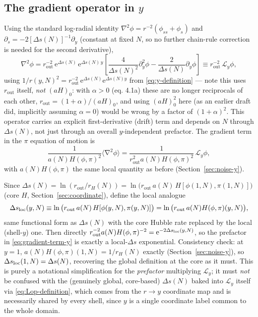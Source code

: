 \documentclass[a4paper,11pt]{article}
\newcommand{\semibold}[1]{{\fontseries{b}\selectfont{#1}}}
\newcommand{\e}[1]{\mathrm{e}^{{#1}}}
\DeclareMathOperator{\grad}{\nabla}
\newenvironment{panel}{\begin{tcolorbox}[enhanced,breakable,colback=gray!10,colframe=gray!30]\small}{\end{tcolorbox}}
\newcommand{\Ny}{N}                          %
\newcommand{\Hub}{H}                         %
\newcommand{\sfactor}{a}                     %
\newcommand{\atloc}{(\field,\mom)}           %
\newcommand{\field}{\phi}                    %
\newcommand{\mom}{\pi}                       %
\newcommand{\rad}{r}                         %
\newcommand{\yco}{y}                         %
\newcommand{\rout}{\rad_{\mathrm{out}}}      %
\newcommand{\aHo}{(\sfactor \Hub)_0}         %
\newcommand{\aHloc}{\sfactor(\Ny)\Hub\atloc} %
\newcommand{\rH}{\rad_H}                     %
\newcommand{\Deltas}{\Delta s}                %
\newcommand{\Lop}{\mathcal{L}_\yco}          %
\begin{document}
\subsection{The gradient operator in $\yco$}
\label{sec:gradient-operator}

Using the standard log-radial identity $\nabla^2\field = \rad^{-2}(\field_{ss}+\field_s)$
and $\partial_s = -2 [ \Deltas(\Ny) ]^{-1} \partial_\yco$ (constant at fixed
$\Ny$, so no further chain-rule correction is needed for the second
derivative),
\begin{equation}
    \nabla^2\field
    =
    \rout^{-2}\,\e{\Deltas(\Ny)}\,\e{\Deltas(\Ny)\,\yco}
    \left[\frac{4}{\Deltas(\Ny)^2}\partial_\yco^2\field - \frac{2}{\Deltas(\Ny)}\partial_\yco\field\right]
    \equiv
    \rout^{-2}\,\Lop\field ,
    \label{eq:Lop-definition}
\end{equation}
using $1/\rad(\yco,\Ny)^2 = \rout^{-2}\,\e{\Deltas(\Ny)}\e{\Deltas(\Ny)\yco}$
from \eqref{eq:y-definition} --- note this uses $\rout$ itself, \emph{not}
$\aHo$: with $\alpha>0$ (eq. 4.1a) these are no longer reciprocals of each
other, $\rout=(1+\alpha)/\aHo$, and using $\aHo^2$ here (as an earlier
draft did, implicitly assuming $\alpha=0$) would be wrong by a factor of
$(1+\alpha)^2$. This operator
carries an explicit first-derivative (drift) term and depends on $\Ny$
through $\Deltas(\Ny)$, not just through an overall $\yco$-independent
prefactor. The gradient term in the $\mom$ equation of motion is
\begin{equation}
    \frac{1}{\aHloc^2}\big\langle\grad^2\field\big\rangle
    =
    \frac{1}{\rout^2\aHloc^2}\,\Lop\field ,
    \label{eq:gradient-term-y}
\end{equation}
with $\aHloc$ the same local quantity as before (Section~\ref{sec:noise-y}).

\begin{panel}
\semibold{The prefactor as a ``local $\Deltas$''.} Since
$\Deltas(\Ny)=\ln(\rout/\rH(\Ny))=\ln\big(\rout\,a(\Ny)\,\Hub[\field(1,\Ny),\mom(1,\Ny)]\big)$
(core $\Hub$, Section~\ref{sec:coordinate}), define the local analogue
\begin{equation}
    \Deltas_{\rm loc}(\yco,\Ny)
    \equiv
    \ln\big(\rout\,a(\Ny)\,\Hub[\field(\yco,\Ny),\mom(\yco,\Ny)]\big)
    =
    \ln\big(\rout\,\aHloc(\yco,\Ny)\big) ,
\end{equation}
same functional form as $\Deltas(\Ny)$ with the core Hubble rate replaced
by the local (shell-$\yco$) one. Then directly
$\rout^{-2}\aHloc^{-2}=\e{-2\Deltas_{\rm loc}(\yco,\Ny)}$, so the prefactor
in \eqref{eq:gradient-term-y} is exactly a local-$\Deltas$ exponential.
Consistency check: at $\yco=1$, $\aHloc(1,\Ny)=1/\rH(\Ny)$ exactly
(Section~\ref{sec:noise-y}), so $\Deltas_{\rm loc}(1,\Ny)=\Deltas(\Ny)$,
recovering the global definition at the core as it must. This is purely a
notational simplification for the \emph{prefactor} multiplying $\Lop$; it
must \emph{not} be confused with the (genuinely global, core-based)
$\Deltas(\Ny)$ baked into $\Lop$ itself via \eqref{eq:Lop-definition},
which comes from the $\rad\to\yco$ coordinate map and is necessarily
shared by every shell, since $\yco$ is a single coordinate label common to
the whole domain.
\end{panel}
\end{document}

